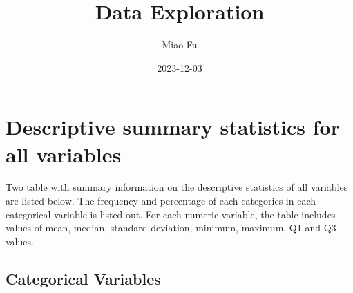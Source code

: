 \documentclass[
  12pt,
]{article}
\title{Data Exploration}
\author{Miao Fu}
\date{2023-12-03}
\begin{document}
\maketitle

\hypertarget{descriptive-summary-statistics-for-all-variables}{%
\section{Descriptive summary statistics for all
variables}\label{descriptive-summary-statistics-for-all-variables}}

Two table with summary information on the descriptive statistics of all
variables are listed below. The frequency and percentage of each
categories in each categorical variable is listed out. For each numeric
variable, the table includes values of mean, median, standard deviation,
minimum, maximum, Q1 and Q3 values.

\hypertarget{categorical-variables}{%
\subsection{Categorical Variables}\label{categorical-variables}}
\end{document}
